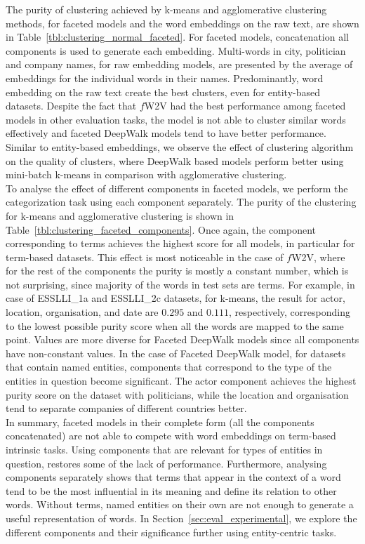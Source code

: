 The purity of clustering achieved by k-means and agglomerative clustering methods, for faceted models and the word embeddings on the raw text, are shown in Table~\ref{tbl:clustering_normal_faceted}. For faceted models, concatenation all components is used to generate each embedding. Multi-words in city, politician and company names, for raw embedding models, are presented by the average of embeddings for the individual words in their names. Predominantly, word embedding on the raw text create the best clusters, even for entity-based datasets. Despite the fact that $f$W2V had the best performance among faceted models in other evaluation tasks, the model is not able to cluster similar words effectively and faceted DeepWalk models tend to have better performance. Similar to entity-based embeddings, we observe the effect of clustering algorithm on the quality of clusters, where DeepWalk based models perform better using mini-batch k-means in comparison with agglomerative clustering.\\
To analyse the effect of different components in faceted models, we perform the categorization task using each component separately. The purity of the clustering for k-means and agglomerative clustering is shown in Table~\ref{tbl:clustering_faceted_components}. Once again, the component corresponding to terms achieves the highest score for all models, in particular for term-based datasets. This effect is most noticeable in the case of $f$W2V, where for the rest of the components the purity is mostly a constant number, which is not surprising, since majority of the words in test sets are terms. For example, in case of ESSLLI\_1a and ESSLLI\_2c datasets, for k-means, the result for actor, location, organisation, and date are $0.295$ and $0.111$, respectively, corresponding to the lowest possible purity score when all the words are mapped to the same point. Values are more diverse for Faceted DeepWalk models since all components have non-constant values. In the case of Faceted DeepWalk model, for datasets that contain named entities, components that correspond to the type of the entities in question become significant. The actor component achieves the highest purity score on the dataset with politicians, while the location and organisation tend to separate companies of different countries better.\\

In summary, faceted models in their complete form (all the components concatenated) are not able to compete with word embeddings on term-based intrinsic tasks. Using components that are relevant for types of entities in question, restores some of the lack of performance. Furthermore, analysing components separately shows that terms that appear in the context of a word tend to be the most influential in its meaning and define its relation to other words. Without terms, named entities on their own are not enough to generate a useful representation of words. In Section~\ref{sec:eval_experimental}, we explore the different components and their significance further using entity-centric tasks. 
